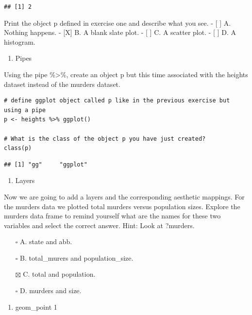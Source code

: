 \documentclass[
]{article}
\providecommand{\tightlist}{%
  \setlength{\itemsep}{0pt}\setlength{\parskip}{0pt}}
\begin{document}
\begin{verbatim}
## [1] 2
\end{verbatim}

Print the object p defined in exercise one and describe what you see. -
{[} {]} A. Nothing happens. - {[}X{]} B. A blank slate plot. - {[} {]}
C. A scatter plot. - {[} {]} D. A histogram.

\begin{enumerate}
\def\labelenumi{\arabic{enumi}.}
\setcounter{enumi}{2}
\tightlist
\item
  Pipes
\end{enumerate}

Using the pipe \%\textgreater\%, create an object p but this time
associated with the heights dataset instead of the murders dataset.

\begin{verbatim}
# define ggplot object called p like in the previous exercise but using a pipe 
p <- heights %>% ggplot()

# What is the class of the object p you have just created?
class(p)
\end{verbatim}

\begin{verbatim}
## [1] "gg"     "ggplot"
\end{verbatim}

\begin{enumerate}
\def\labelenumi{\arabic{enumi}.}
\setcounter{enumi}{3}
\tightlist
\item
  Layers
\end{enumerate}

Now we are going to add a layers and the corresponding aesthetic
mappings. For the murders data we plotted total murders versus
population sizes. Explore the murders data frame to remind yourself what
are the names for these two variables and select the correct answer.
Hint: Look at ?murders.

\begin{itemize}
\tightlist
\item[$\square$]
  A. state and abb.
\item[$\square$]
  B. total\_murers and population\_size.
\item[$\boxtimes$]
  C. total and population.
\item[$\square$]
  D. murders and size.
\end{itemize}

\begin{enumerate}
\def\labelenumi{\arabic{enumi}.}
\setcounter{enumi}{4}
\tightlist
\item
  geom\_point 1
\end{enumerate}
\end{document}

